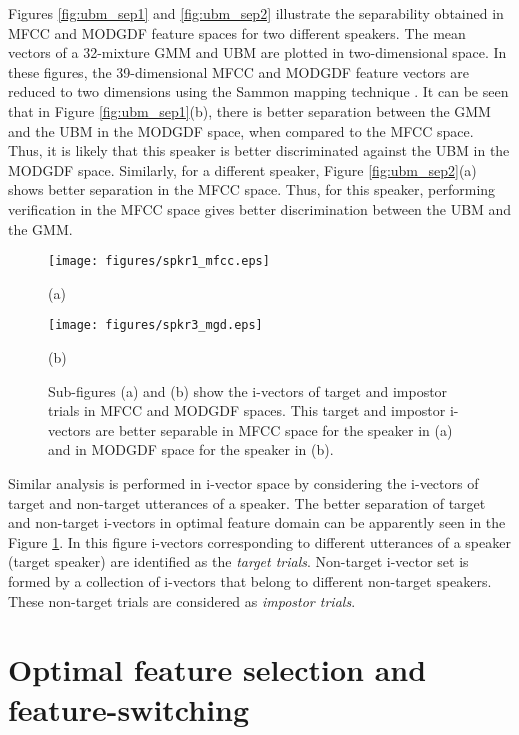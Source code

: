 \documentclass{article}
\begin{document}
Figures \ref{fig:ubm_sep1} and \ref{fig:ubm_sep2} illustrate the
separability obtained in MFCC and MODGDF feature spaces for two different
speakers. The mean vectors of a 32-mixture GMM and UBM are plotted in
two-dimensional space. In these figures, the 39-dimensional MFCC and MODGDF
feature vectors are reduced to two dimensions using the Sammon mapping technique
\cite{sammon}. It can be seen that in Figure \ref{fig:ubm_sep1}(b), there is
better separation between the GMM and the UBM in the MODGDF space, when compared
to the MFCC space. Thus, it is likely that this speaker is better discriminated
against the UBM in the MODGDF space. Similarly, for a different speaker, 
Figure \ref{fig:ubm_sep2}(a) shows better separation in the MFCC space. Thus,
for this speaker, performing verification in the MFCC space gives better
discrimination between the UBM and the GMM. 

\begin{figure}[h!tb]
\centering \hspace{-5cm}
\begin{minipage}{0.65\textwidth}
\centering 
\texttt{[image: figures/spkr1\_mfcc.eps]}
\caption*{(a)}
\label{fig:subfig3}
\end{minipage}%
\begin{minipage}{0.25\textwidth}
\centering \hspace{10cm}
\texttt{[image: figures/spkr3\_mgd.eps]}
\caption*{(b)}
\label{fig:subfig4}
\end{minipage}
\caption{Sub-figures (a) and (b) show the i-vectors of target and impostor trials in MFCC and MODGDF spaces. This target and impostor i-vectors are better separable in MFCC space for the speaker in (a) and in MODGDF space for the speaker  in (b).}
\label{fig:ivec_separation}
\end{figure}

Similar analysis is performed in i-vector space by considering the i-vectors of target and non-target utterances of a speaker. The better separation of target and non-target i-vectors in optimal feature domain can be apparently seen in the Figure \ref{fig:ivec_separation}. In this figure i-vectors corresponding to different utterances of a speaker (target speaker) are identified as the \emph{target trials}. Non-target i-vector set is formed by a collection of i-vectors that belong to different non-target speakers. These non-target trials are considered as \emph{impostor trials}. 

\section{Optimal feature selection and feature-switching}
\label{sec:optFeat}
\end{document}
